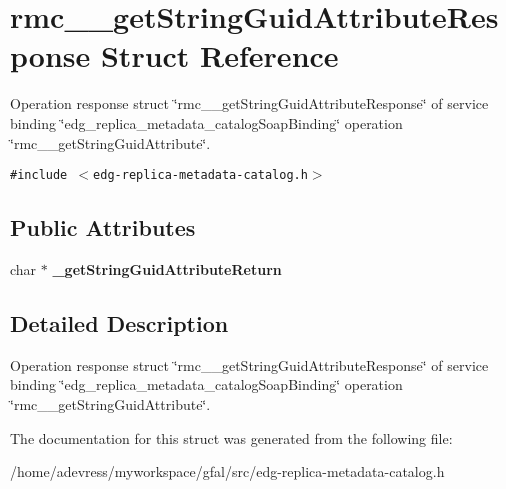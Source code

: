 \section{rmc\_\-\_\-get\-String\-Guid\-Attribute\-Response Struct Reference}
\label{structrmc____getStringGuidAttributeResponse}
Operation response struct \char`\"{}rmc\_\-\_\-get\-String\-Guid\-Attribute\-Response\char`\"{} of service binding \char`\"{}edg\_\-replica\_\-metadata\_\-catalog\-Soap\-Binding\char`\"{} operation \char`\"{}rmc\_\-\_\-get\-String\-Guid\-Attribute\char`\"{}.  


{\tt \#include $<$edg-replica-metadata-catalog.h$>$}

\subsection*{Public Attributes}
\begin{CompactItemize}
\item 
char $\ast$ \textbf{\_\-get\-String\-Guid\-Attribute\-Return}\label{structrmc____getStringGuidAttributeResponse_0179fdfdc46b2b289ee766a1a274d9a1}

\end{CompactItemize}


\subsection{Detailed Description}
Operation response struct \char`\"{}rmc\_\-\_\-get\-String\-Guid\-Attribute\-Response\char`\"{} of service binding \char`\"{}edg\_\-replica\_\-metadata\_\-catalog\-Soap\-Binding\char`\"{} operation \char`\"{}rmc\_\-\_\-get\-String\-Guid\-Attribute\char`\"{}. 



The documentation for this struct was generated from the following file:\begin{CompactItemize}
\item 
/home/adevress/myworkspace/gfal/src/edg-replica-metadata-catalog.h\end{CompactItemize}
